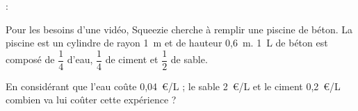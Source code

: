  :

Pour les besoins d'une vidéo, Squeezie cherche à remplir une piscine de béton. 
La piscine est un cylindre de rayon 1~m et de hauteur 0,6~m. 
1~L de béton est composé de $\dfrac{1}{4}$ d'eau, $\dfrac{1}{4}$ de ciment et $\dfrac{1}{2}$ de sable.

En considérant que l'eau coûte 0,04~€/L ; le sable 2~€/L et le ciment 0,2~€/L combien va lui coûter cette expérience ?
